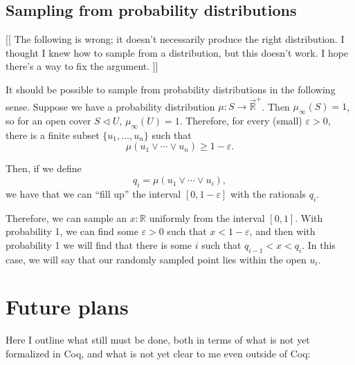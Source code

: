 \documentclass{article}           %
\newcommand{\R}{\mathbb{R}}
\newcommand{\lowerT}[1]{\overrightarrow{#1}}
\newcommand{\cov}{\vartriangleleft}
\begin{document}
\subsection{Sampling from probability distributions}

[[ The following is wrong; it doesn't necessarily produce the right distribution. I thought I knew how to sample from a distribution, but this doesn't work. I hope there's a way to fix the argument. ]]

It should be possible to sample from probability distributions in the following sense. Suppose we have a probability distribution $\mu : S \to \lowerT{\R}^+$. Then $\mu_\infty(S) = 1$, so for an open cover $S \cov U$, $\mu_\infty(U) = 1$. Therefore, for every (small) $\varepsilon > 0$, there is a finite subset $\{u_1, \ldots, u_n \}$ such that
\[
\mu(u_1 \vee \cdots \vee u_n) \ge 1 - \varepsilon.
\]

Then, if we define
\[
q_i = \mu(u_1 \vee \cdots \vee u_i),
\]
we have that we can ``fill up'' the interval $[0, 1 - \varepsilon]$ with the rationals $q_i$.

Therefore, we can sample an $x : \R$ uniformly from the interval $[0, 1]$. With probability 1, we can find some $\varepsilon > 0$ such that $x < 1 - \varepsilon$, and then with probability 1 we will find that there is some $i$ such that $q_{i-1} < x < q_i$. In this case, we will say that our randomly sampled point lies within the open $u_i$.

\section{Future plans}

Here I outline what still must be done, both in terms of what is not yet formalized in Coq, and what is not yet clear to me even outside of Coq:
\end{document}

